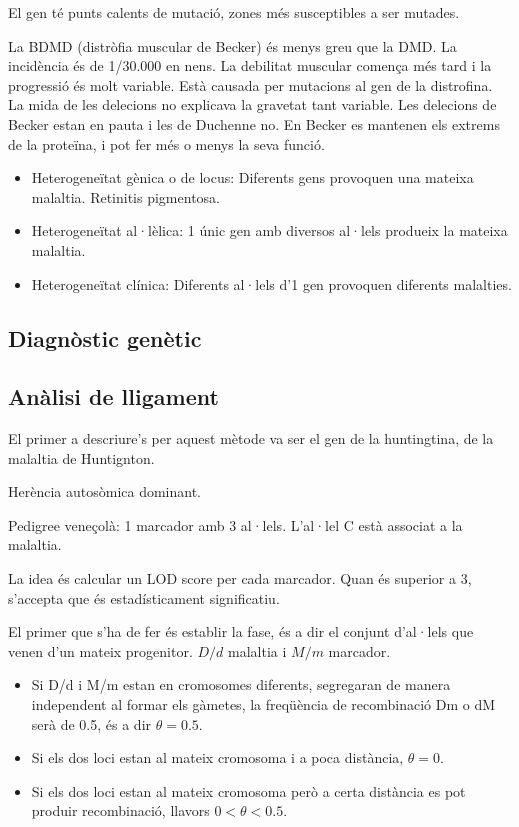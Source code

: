 El gen té punts calents de mutació, zones més susceptibles a ser mutades.

La BDMD (distròfia muscular de Becker) és menys greu que la DMD. La
incidència és de 1/30.000 en nens. La debilitat muscular comença més
tard i la progressió és molt variable. Està causada per mutacions al
gen de la distrofina. La mida de les delecions no explicava la
gravetat tant variable. Les delecions de Becker estan en pauta i les
de Duchenne no. En Becker es mantenen els extrems de la proteïna, i
pot fer més o menys la seva funció.

\begin{itemize}
\item Heterogeneïtat gènica o de locus: Diferents gens provoquen una
  mateixa malaltia. Retinitis pigmentosa.
  
\item Heterogeneïtat al·lèlica: 1 únic gen amb diversos al·lels
  produeix la mateixa malaltia.
  
\item Heterogeneïtat clínica: Diferents al·lels d'1 gen provoquen
  diferents malalties.
\end{itemize}

\subsection{Diagnòstic genètic}

\subsection{Anàlisi de lligament}
\label{sec:lligament}
El primer a descriure's per aquest mètode va ser el gen de la
huntingtina, de la malaltia de Huntignton.

Herència autosòmica dominant.

Pedigree veneçolà: 1 marcador amb 3 al·lels. L'al·lel C està associat
a la malaltia.

La idea és calcular un LOD score per cada marcador. Quan és superior a
3, s'accepta que és estadísticament significatiu.

El primer que s'ha de fer és establir la fase, és a dir el conjunt
d'al·lels que venen d'un mateix progenitor. $D/d$ malaltia i $M/m$
marcador.
\begin{itemize}
\item Si D/d i M/m estan en cromosomes diferents, segregaran de manera
  independent al formar els gàmetes, la freqüència de recombinació Dm
  o dM serà de 0.5, és a dir $\theta = 0.5$.
\item Si els dos loci estan al mateix cromosoma i a poca distància, $\theta = 0$.
\item Si els dos loci estan al mateix cromosoma però a certa distància
  es pot produir recombinació, llavors $0 < \theta < 0.5$.
\end{itemize}

